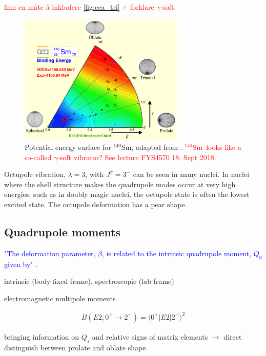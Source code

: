 \documentclass[twoside,english]{uiofysmaster/uiofysmaster}
\newcommand{\Sm}{$^{140}$Sm} %
\newcommand{\ga}{$\gamma$}
\let\orgautoref\autoref
\renewcommand{\autoref}
        {%
		 \def\sectionautorefname{Section}%
		 \def\subsectionautorefname{Section}%
		 \def\subsubsectionautorefname{Section}%
		 \def\chapterautorefname{Chapter}%
          \orgautoref}
\begin{document}
\textcolor{red}{finn en måte å inkludere \autoref{fig:cea_tri} + forklare \ga-soft.}

\begin{figure}[ht]
	\centering
	\includegraphics[width=0.7\textwidth]{Images/Triaxial-map-drawing.png}
	\caption{Potential energy surface for \Sm, adapted from \cite{Hilaire2007, CEA}. \textcolor{red}{\Sm\ looks like a so-called \ga-soft vibrator? See lecture FYS4570 18. Sept 2018.}}
	\label{fig:cea_tri}
\end{figure}

Octupole vibration, $\lambda = 3$, with $J^\pi = 3^-$ can be seen in many nuclei.
In nuclei where the shell structure makes the quadrupole modes occur at very high energies, such as in doubly magic nuclei, the octupole state is often the lowest excited state.
The octupole deformation has a pear shape.







\subsection{Quadrupole moments}

\textcolor{blue}{"The deformation parameter, $\beta$, is related to the intrinsic quadrupole moment, $Q_0$ given by"} \cite{Klintefjord}.

\bigskip

intrinsic (body-fixed frame), spectroscopic (lab frame)

electromagnetic multipole moments

\begin{align}
	B(E2; 0^+ \rightarrow 2^+) = \langle 0^+| E2 | 2^+ \rangle^2
\end{align}

bringing information on $Q_s$ and relative signs of matrix elements $\rightarrow$ direct distinguish between prolate and oblate shape
\end{document}
